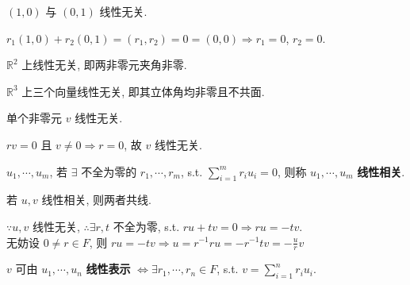 \documentclass{note}
\begin{document}
\begin{eg}
    $(1,0)$ 与 $(0,1)$ 线性无关.
\end{eg}
\begin{pf}
    $r_1(1,0)+r_2(0,1)=(r_1,r_2)=0=(0,0)\Longrightarrow r_1=0$, $r_2=0$.
\end{pf}

\begin{eg}
    $\mathbb{R}^2$ 上线性无关, 即两非零元夹角非零.
\end{eg}

\begin{eg}
    $\mathbb{R}^3$ 上三个向量线性无关, 即其立体角均非零且不共面.
\end{eg}

单个非零元 $v$ 线性无关.
\begin{pf}
    $rv=0$ 且 $v\neq 0\Longrightarrow r=0$, 故 $v$ 线性无关.
\end{pf}

\begin{df}[线性相关]
    $u_1,\cdots,u_m$, 若 $\exists$ 不全为零的 $r_1,\cdots,r_m$, s.t. $\sum_{i=1}^mr_iu_i=0$, 则称 $u_1,\cdots,u_m$ \textbf{线性相关}.
\end{df}

若 $u,v$ 线性相关, 则两者共线.
\begin{pf}
    $\because u,v$ 线性无关, $\therefore\exists r,t$ 不全为零, s.t. $ru+tv=0\Longrightarrow ru=-tv$.\\
    无妨设 $0\neq r\in F$, 则 $ru=-tv\Longrightarrow u=r^{-1}ru=-r^{-1}tv=-\frac{u}{r}v$
\end{pf}

\begin{df}[线性表示]
    $v$ 可由 $u_1,\cdots,u_n$ \textbf{线性表示} $\Longleftrightarrow\exists r_1,\cdots,r_n\in F$, s.t. $v=\sum_{i=1}^nr_iu_i$.
\end{df}
\end{document}

